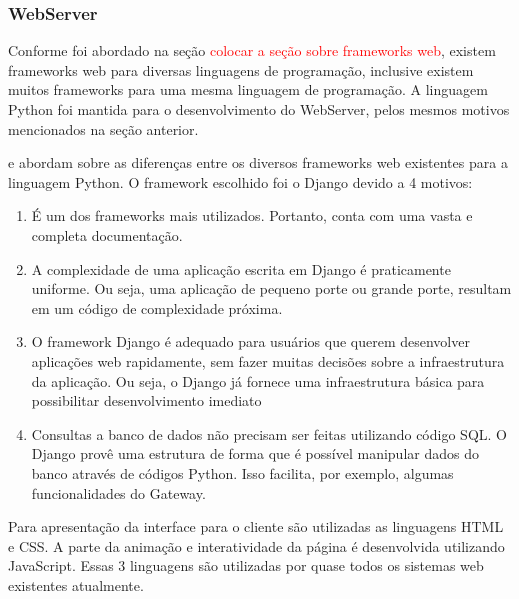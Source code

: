 			\subsubsection{WebServer}
				Conforme foi abordado na seção \textcolor{red}{colocar a seção sobre frameworks web}, existem frameworks web para diversas linguagens de programação, inclusive existem muitos frameworks para uma mesma linguagem de programação. A linguagem Python foi mantida para o desenvolvimento do WebServer, pelos mesmos motivos mencionados na seção anterior.
				
				\textcite{bogdan2017} e \textcite{ryan2015} abordam sobre as diferenças entre os diversos frameworks web existentes para a linguagem Python. O framework escolhido foi o Django devido a 4 motivos: 
				
				\begin{enumerate}
					\item 
					É um dos frameworks mais utilizados. Portanto, conta com uma vasta e completa documentação. 
					\item 
					A complexidade de uma aplicação escrita em Django é praticamente uniforme. Ou seja, uma aplicação de pequeno porte ou grande porte, resultam em um código de complexidade próxima.
					\item 
					O framework Django é adequado para usuários	que querem desenvolver aplicações web rapidamente, sem fazer muitas decisões sobre a infraestrutura da aplicação. Ou seja, o Django já fornece uma infraestrutura básica para possibilitar desenvolvimento imediato
					\item 
					Consultas a banco de dados não precisam ser feitas utilizando código SQL. O Django provê uma estrutura de forma que é possível manipular dados do banco através de códigos Python. Isso facilita, por exemplo, algumas funcionalidades do Gateway.
				\end{enumerate}
			
				Para apresentação da interface para o cliente são utilizadas as linguagens HTML e CSS. A parte da animação e interatividade da página é desenvolvida utilizando JavaScript. Essas 3 linguagens são utilizadas por quase todos os sistemas web existentes atualmente.
				